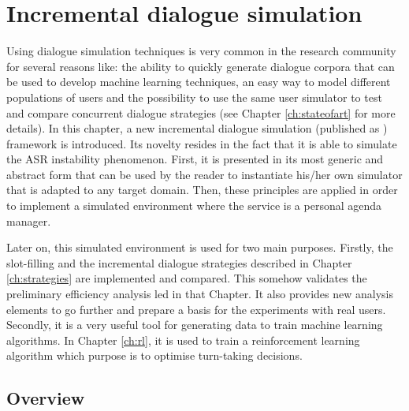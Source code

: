 \chapter{Incremental dialogue simulation}
\label{ch:simulation}

	
	Using dialogue simulation techniques is very common in the research community \cite{Eckert1997,Pietquin2013} for several reasons like: the ability to quickly generate dialogue corpora that can be used to develop machine learning techniques, an easy way to model different populations of users and the possibility to use the same user simulator to test and compare concurrent dialogue strategies (see Chapter \ref{ch:stateofart} for more details). In this chapter, a new incremental dialogue simulation (published as \cite{Khouzaimi2016a}) framework is introduced. Its novelty resides in the fact that it is able to simulate the ASR instability phenomenon. First, it is presented in its most generic and abstract form that can be used by the reader to instantiate his/her own simulator that is adapted to any target domain. Then, these principles are applied in order to implement a simulated environment where the service is a personal agenda manager.
	
	Later on, this simulated environment is used for two main purposes. Firstly, the slot-filling and the incremental dialogue strategies described in Chapter \ref{ch:strategies} are implemented and compared. This somehow validates the preliminary efficiency analysis led in that Chapter. It also provides new analysis elements to go further and prepare a basis for the experiments with real users. Secondly, it is a very useful tool for generating data to train machine learning algorithms. In Chapter \ref{ch:rl}, it is used to train a reinforcement learning algorithm which purpose is to optimise turn-taking decisions.
						
\section{Overview}
	
